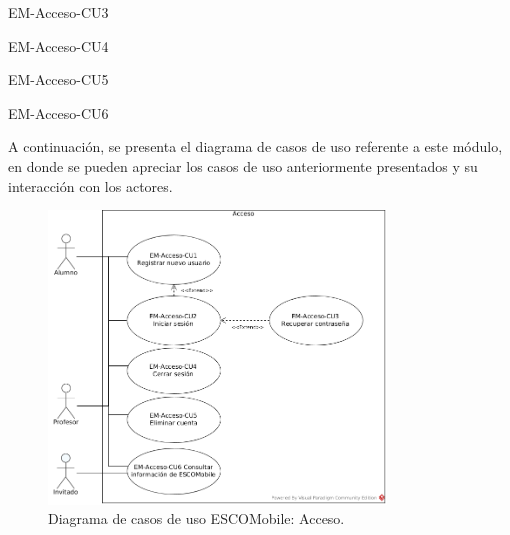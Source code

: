 \begin{requisitos}{EM-Acceso-CU3}
\end{requisitos}

\begin{requisitos}{EM-Acceso-CU4}
\end{requisitos}

\begin{requisitos}{EM-Acceso-CU5}
\end{requisitos}

\begin{requisitos}{EM-Acceso-CU6}
\end{requisitos}

\noindent
A continuación, se presenta el diagrama de casos de uso referente a este módulo, en donde se pueden apreciar
los casos de uso anteriormente presentados y su interacción con los actores.

\pagebreak
\begin{figure}[htbp!]
	\centering
	\includegraphics[width=0.8\textwidth]{images/casos/acceso}
	\caption{Diagrama de casos de uso ESCOMobile: Acceso.}
\end{figure}




